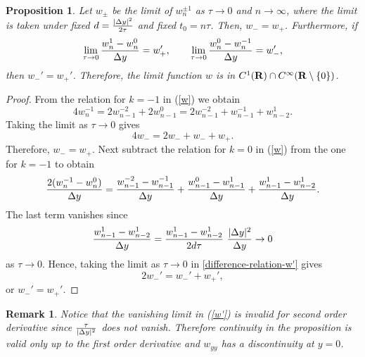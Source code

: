 \documentclass[11pt]{amsart}
\def\R{{\bf R}}
\def\R{\mathbb{R}}
\def\d{d}
\def\R{{\bf R}}
\newtheorem{proposition}{Proposition}[section]
\newtheorem{remark}{Remark}[section]
\begin{document}
\begin{proposition}\label{proposition} Let $w_\pm$ be the limit of $w_n^{\pm1}$ as $\tau \to0$ and $n\to\infty$, where the limit is taken under fixed $\d={|\Delta y|^2\over 2\tau}$ and fixed $t_0=n\tau$. Then, $w_-=w_+$. Furthermore, if
$$
\lim_{\tau \to0}{w_n^{1}-w_n^0\over\Delta y}=w_+',\qquad \lim_{\tau \to0}{w_n^{0}-w_n^{-1}\over\Delta y}=w_-',
$$
then $w_-'=w_+'$. Therefore, the limit function $w$ is in $C^1(\R)\cap C^\infty(\R\setminus\{0\})$.
\end{proposition}
\begin{proof} From the relation for $k=-1$ in (\ref{w}) we obtain
$$
4w_n^{-1}=2w_{n-1}^{-2}+2w_{n-1}^{0} =2w_{n-1}^{-2}+w_{n-1}^{-1}+w_{n-2}^{1}.
$$
Taking the limit  as $\tau \to0$ gives
$$
4w_-=2w_-+w_-+w_+.
$$
Therefore, $w_-=w_+$. Next subtract the relation for $k=0$ in (\ref{w}) from the one for $k=-1$ to obtain
\begin{equation}\label{difference-relation-w'}
{2(w^{-1}_n-w_n^0)\over\Delta y} ={w^{-2}_{n-1}-w_{n-1}^{-1}\over\Delta y} +{w^{0}_{n-1}-w_{n-1}^{1}\over\Delta y} +{w^{1}_{n-1}-w_{n-2}^{1}\over\Delta y}.
\end{equation}
The last term vanishes since
\begin{equation}\label{w'}
{w^{1}_{n-1}-w_{n-2}^{1}\over\Delta y}={w^{1}_{n-1}-w_{n-2}^{1}\over2\d\tau}\ {|\Delta y|^2\over\Delta y}\to 0
\end{equation}
as $\tau \to0$. Hence, taking the limit as $\tau\to0$ in \eqref{difference-relation-w'} gives
$$
2w_-'=w_-'+w_+',
$$
or $w_-'=w_+'$.
\end{proof}

\begin{remark}
Notice that the vanishing limit in (\ref{w'}) is invalid for second order derivative since ${\tau\over|\Delta y|^2}$ does not vanish. Therefore continuity in the proposition is valid only up to the first order derivative and $w_{yy}$ has a discontinuity at $y=0$.
\end{remark}
\end{document}
